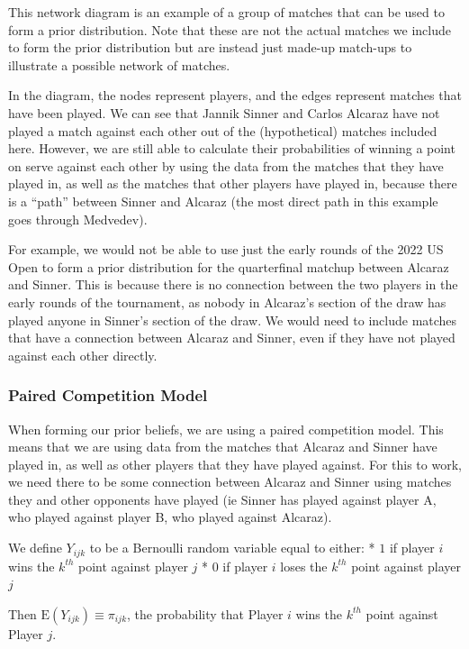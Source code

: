\documentclass[
  letterpaper,
  DIV=11,
  numbers=noendperiod]{scrartcl}
\begin{document}
\linespread{2}

This network diagram is an example of a group of matches that can be
used to form a prior distribution. Note that these are not the actual
matches we include to form the prior distribution but are instead just
made-up match-ups to illustrate a possible network of matches.

In the diagram, the nodes represent players, and the edges represent
matches that have been played. We can see that Jannik Sinner and Carlos
Alcaraz have not played a match against each other out of the
(hypothetical) matches included here. However, we are still able to
calculate their probabilities of winning a point on serve against each
other by using the data from the matches that they have played in, as
well as the matches that other players have played in, because there is
a ``path'' between Sinner and Alcaraz (the most direct path in this
example goes through Medvedev).

For example, we would not be able to use just the early rounds of the
2022 US Open to form a prior distribution for the quarterfinal matchup
between Alcaraz and Sinner. This is because there is no connection
between the two players in the early rounds of the tournament, as nobody
in Alcaraz's section of the draw has played anyone in Sinner's section
of the draw. We would need to include matches that have a connection
between Alcaraz and Sinner, even if they have not played against each
other directly.

\subsubsection{Paired Competition Model}\label{paired-competition-model}

When forming our prior beliefs, we are using a paired competition model.
This means that we are using data from the matches that Alcaraz and
Sinner have played in, as well as other players that they have played
against. For this to work, we need there to be some connection between
Alcaraz and Sinner using matches they and other opponents have played
(ie Sinner has played against player A, who played against player B, who
played against Alcaraz).

We define \(Y_{ijk}\) to be a Bernoulli random variable equal to either:
* \(1\) if player \(i\) wins the \(k^{th}\) point against player \(j\) *
\(0\) if player \(i\) loses the \(k^{th}\) point against player \(j\)

Then \(\text{E}(Y_{ijk}) \equiv \pi_{ijk}\), the probability that Player
\(i\) wins the \(k^{th}\) point against Player \(j\).
\end{document}

